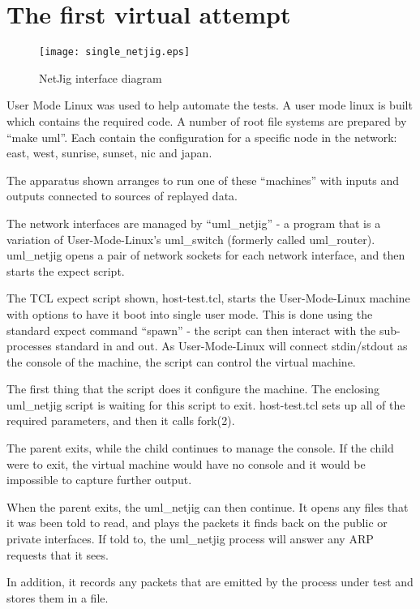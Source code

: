 \section{The first virtual attempt}

\begin{figure}[ht]
\texttt{[image: single\_netjig.eps]} 
\caption{NetJig interface diagram}
\label{netjig}
\end{figure}

User Mode Linux was used to help automate the tests. A user mode linux
is built which contains the required code. A number of
root file systems are prepared by ``make uml''. Each contain the
configuration for a specific node in the network: east, west, sunrise,
sunset, nic and japan.

The apparatus shown arranges to run one of these ``machines'' with
inputs and outputs connected to sources of replayed data.

The network interfaces are managed by ``uml\_netjig'' - a program that is
a variation of User-Mode-Linux's uml\_switch (formerly called uml\_router).
uml\_netjig opens a pair of network sockets for each network interface,
and then starts the expect script.

The TCL expect script shown, host-test.tcl, starts the User-Mode-Linux
machine with options to have it boot into single user mode. This is done using
the standard expect command ``spawn'' - the script can then interact
with the sub-processes standard in and out. As User-Mode-Linux will
connect stdin/stdout as the console of the machine, the script
can control the virtual machine. 

The first thing that the script does it configure the machine. The
enclosing uml\_netjig script is waiting for this script to
exit. host-test.tcl sets up all of the required parameters, and
then it calls fork(2).

The parent exits, while the child continues to manage the console. If the
child were to exit, the virtual machine would have no console and it would
be impossible to capture further output.

When the parent exits, the uml\_netjig can then continue. It opens 
any files that it was been told to read, and plays the packets it finds
back on the public or private interfaces. If told to, the uml\_netjig
process will answer any ARP requests that it sees.

In addition, it records any packets that are emitted by the process
under test and stores them in a file.


